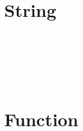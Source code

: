 \begin{lstlisting}[language=JavaScript]

\end{lstlisting}


\chapter{String}



\begin{lstlisting}[language=JavaScript]

\end{lstlisting}




\begin{lstlisting}[language=JavaScript]

\end{lstlisting}





\begin{lstlisting}[language=JavaScript]

\end{lstlisting}




\begin{lstlisting}[language=JavaScript]

\end{lstlisting}





\begin{lstlisting}[language=JavaScript]

\end{lstlisting}




\begin{lstlisting}[language=JavaScript]

\end{lstlisting}





\begin{lstlisting}[language=JavaScript]

\end{lstlisting}


\chapter{Function}


